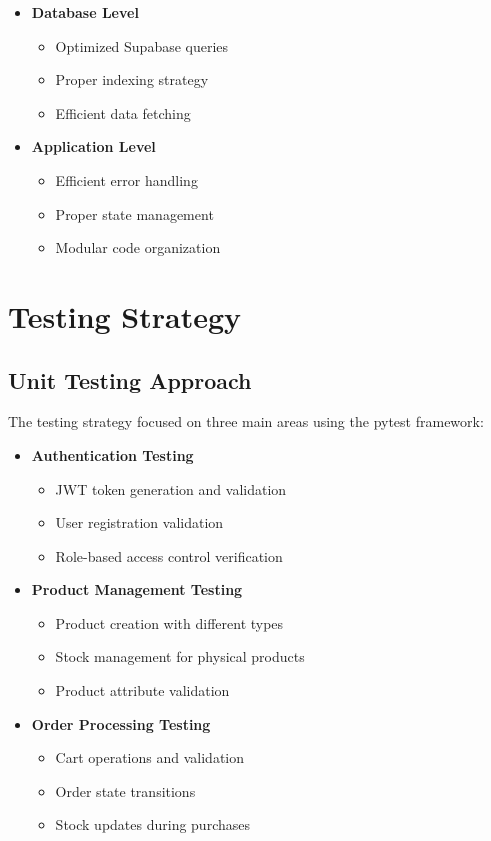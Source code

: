 \documentclass[12pt,a4paper]{article}
\begin{document}
\begin{itemize}
    \item \textbf{Database Level}
    \begin{itemize}
        \item Optimized Supabase queries
        \item Proper indexing strategy
        \item Efficient data fetching
    \end{itemize}
    
    \item \textbf{Application Level}
    \begin{itemize}
        \item Efficient error handling
        \item Proper state management
        \item Modular code organization
    \end{itemize}
\end{itemize}

\section{Testing Strategy}

\subsection{Unit Testing Approach}
The testing strategy focused on three main areas using the pytest framework:

\begin{itemize}
    \item \textbf{Authentication Testing}
    \begin{itemize}
        \item JWT token generation and validation
        \item User registration validation
        \item Role-based access control verification
    \end{itemize}

    \item \textbf{Product Management Testing}
    \begin{itemize}
        \item Product creation with different types
        \item Stock management for physical products
        \item Product attribute validation
    \end{itemize}

    \item \textbf{Order Processing Testing}
    \begin{itemize}
        \item Cart operations and validation
        \item Order state transitions
        \item Stock updates during purchases
    \end{itemize}
\end{itemize}
\end{document}
